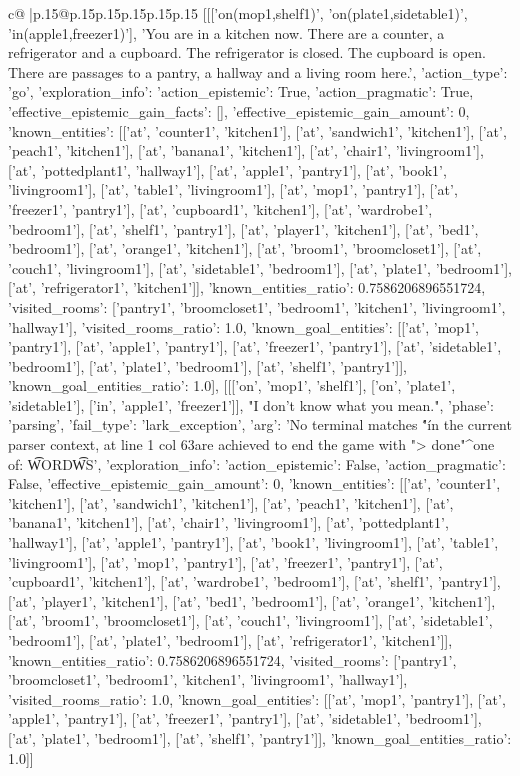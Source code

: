 \documentclass{article}
\begin{document}
{\begin{supertabular}{c@{$\;$}|p{.15\linewidth}@{}p{.15\linewidth}p{.15\linewidth}p{.15\linewidth}p{.15\linewidth}p{.15\linewidth}}
{{{	 [[['on(mop1,shelf1)', 'on(plate1,sidetable1)', 'in(apple1,freezer1)'], 'You are in a kitchen now. There are a counter, a refrigerator and a cupboard. The refrigerator is closed. The cupboard is open. There are passages to a pantry, a hallway and a living room here.', {'action_type': 'go', 'exploration_info': {'action_epistemic': True, 'action_pragmatic': True, 'effective_epistemic_gain_facts': [], 'effective_epistemic_gain_amount': 0, 'known_entities': [['at', 'counter1', 'kitchen1'], ['at', 'sandwich1', 'kitchen1'], ['at', 'peach1', 'kitchen1'], ['at', 'banana1', 'kitchen1'], ['at', 'chair1', 'livingroom1'], ['at', 'pottedplant1', 'hallway1'], ['at', 'apple1', 'pantry1'], ['at', 'book1', 'livingroom1'], ['at', 'table1', 'livingroom1'], ['at', 'mop1', 'pantry1'], ['at', 'freezer1', 'pantry1'], ['at', 'cupboard1', 'kitchen1'], ['at', 'wardrobe1', 'bedroom1'], ['at', 'shelf1', 'pantry1'], ['at', 'player1', 'kitchen1'], ['at', 'bed1', 'bedroom1'], ['at', 'orange1', 'kitchen1'], ['at', 'broom1', 'broomcloset1'], ['at', 'couch1', 'livingroom1'], ['at', 'sidetable1', 'bedroom1'], ['at', 'plate1', 'bedroom1'], ['at', 'refrigerator1', 'kitchen1']], 'known_entities_ratio': 0.7586206896551724, 'visited_rooms': ['pantry1', 'broomcloset1', 'bedroom1', 'kitchen1', 'livingroom1', 'hallway1'], 'visited_rooms_ratio': 1.0, 'known_goal_entities': [['at', 'mop1', 'pantry1'], ['at', 'apple1', 'pantry1'], ['at', 'freezer1', 'pantry1'], ['at', 'sidetable1', 'bedroom1'], ['at', 'plate1', 'bedroom1'], ['at', 'shelf1', 'pantry1']], 'known_goal_entities_ratio': 1.0}}], [[['on', 'mop1', 'shelf1'], ['on', 'plate1', 'sidetable1'], ['in', 'apple1', 'freezer1']], "I don't know what you mean.", {'phase': 'parsing', 'fail_type': 'lark_exception', 'arg': 'No terminal matches \'"\' in the current parser context, at line 1 col 63\n\ngoals are achieved to end the game with "> done"\n                                        ^\nExpected one of: \n\t* WORD\n\t* WS\n', 'exploration_info': {'action_epistemic': False, 'action_pragmatic': False, 'effective_epistemic_gain_amount': 0, 'known_entities': [['at', 'counter1', 'kitchen1'], ['at', 'sandwich1', 'kitchen1'], ['at', 'peach1', 'kitchen1'], ['at', 'banana1', 'kitchen1'], ['at', 'chair1', 'livingroom1'], ['at', 'pottedplant1', 'hallway1'], ['at', 'apple1', 'pantry1'], ['at', 'book1', 'livingroom1'], ['at', 'table1', 'livingroom1'], ['at', 'mop1', 'pantry1'], ['at', 'freezer1', 'pantry1'], ['at', 'cupboard1', 'kitchen1'], ['at', 'wardrobe1', 'bedroom1'], ['at', 'shelf1', 'pantry1'], ['at', 'player1', 'kitchen1'], ['at', 'bed1', 'bedroom1'], ['at', 'orange1', 'kitchen1'], ['at', 'broom1', 'broomcloset1'], ['at', 'couch1', 'livingroom1'], ['at', 'sidetable1', 'bedroom1'], ['at', 'plate1', 'bedroom1'], ['at', 'refrigerator1', 'kitchen1']], 'known_entities_ratio': 0.7586206896551724, 'visited_rooms': ['pantry1', 'broomcloset1', 'bedroom1', 'kitchen1', 'livingroom1', 'hallway1'], 'visited_rooms_ratio': 1.0, 'known_goal_entities': [['at', 'mop1', 'pantry1'], ['at', 'apple1', 'pantry1'], ['at', 'freezer1', 'pantry1'], ['at', 'sidetable1', 'bedroom1'], ['at', 'plate1', 'bedroom1'], ['at', 'shelf1', 'pantry1']], 'known_goal_entities_ratio': 1.0}}]] 
}}}
\end{supertabular}}
\end{document}
